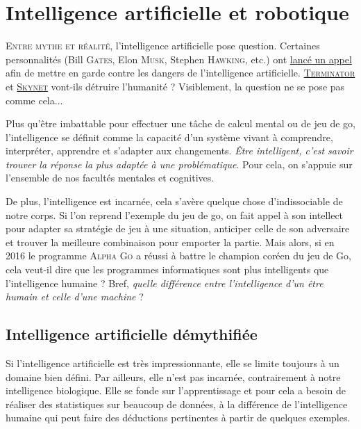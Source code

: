 \chapter[Intelligence artificielle et robotique]{Intelligence artificielle et robotique}
\label{chap:III}

\lettrine{E}{ntre mythe et réalité}, l'intelligence artificielle pose question. Certaines personnalités (Bill \textsc{Gates}, Elon \textsc{Musk}, Stephen \textsc{Hawking}, etc.) ont \href{https://www.lemonde.fr/pixels/article/2015/07/27/intelligence-artificielle-hawking-musk-et-chomsky-reclament-l-interdiction-des-armes-autonomes_4701102_4408996.html}{lancé un appel} afin de mettre en garde contre les dangers de l’intelligence artificielle. \href{https://fr.wikipedia.org/wiki/Terminator}{\textsc{Terminator}} et \href{https://fr.wikipedia.org/wiki/Personnages_de_Terminator#S}{\textsc{Skynet}} vont-ils détruire l'humanité ? Visiblement, la question ne se pose pas comme cela...

Plus qu’être imbattable pour effectuer une tâche de calcul mental ou de jeu de go, l’intelligence se définit comme la capacité d’un système vivant à comprendre, interpréter, apprendre et s’adapter aux changements. \emph{Être intelligent, c’est savoir trouver la réponse la plus adaptée à une problématique}. Pour cela, on s’appuie sur l’ensemble de nos facultés mentales et cognitives. 

De plus, l’intelligence est incarnée, cela s'avère quelque chose d'indissociable de notre corps. Si l’on reprend l’exemple du jeu de go, on fait appel à son intellect pour adapter sa stratégie de jeu à une situation, anticiper celle de son adversaire et trouver la meilleure combinaison pour emporter la partie. Mais alors, si en 2016 le programme \textsc{Alpha Go} a réussi à battre le champion coréen du jeu de Go, cela veut-il dire que les programmes informatiques sont plus intelligents que l’intelligence humaine ? Bref, \emph{quelle différence entre l’intelligence d’un être humain et celle d’une machine} ?


\section[Intelligence artificielle démythifiée]{Intelligence artificielle démythifiée}
\label{sec:III.1}

Si l’intelligence artificielle est très impressionnante, elle se limite toujours à un domaine bien défini. Par ailleurs, elle n’est pas incarnée, contrairement à notre intelligence biologique. Elle se fonde sur l’apprentissage et pour cela a besoin de réaliser des statistiques sur beaucoup de données, à la différence de l'intelligence humaine qui peut faire des déductions pertinentes à partir de quelques exemples. 

